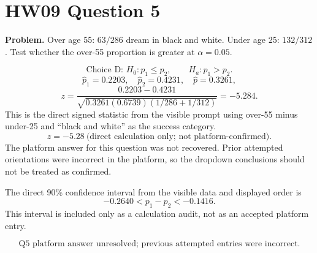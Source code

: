 \documentclass[11pt]{article}
\begin{document}
\section*{HW09 Question 5}

\textbf{Problem.} Over age 55: \(63/286\) dream in black and white. Under age 25: \(132/312\). Test whether the over-55 proportion is greater at \(\alpha=0.05\).

\[
\boxed{\text{Choice D: }H_0:p_1\le p_2,\qquad H_a:p_1>p_2.}
\]
\[
\hat p_1=0.2203,\quad \hat p_2=0.4231,\quad \hat p=0.3261,
\]
\[
z=\frac{0.2203-0.4231}{\sqrt{0.3261(0.6739)(1/286+1/312)}}=-5.284.
\]
This is the direct signed statistic from the visible prompt using over-55 minus under-25 and ``black and white'' as the success category.
\[
\boxed{z=-5.28\ \text{(direct calculation only; not platform-confirmed).}}
\]
The platform answer for this question was not recovered. Prior attempted orientations were incorrect in the platform, so the dropdown conclusions should not be treated as confirmed.

The direct 90\% confidence interval from the visible data and displayed order is
\[
-0.2640 < p_1-p_2 < -0.1416.
\]
This interval is included only as a calculation audit, not as an accepted platform entry.

\[
\boxed{\text{Q5 platform answer unresolved; previous attempted entries were incorrect.}}
\]
\end{document}
